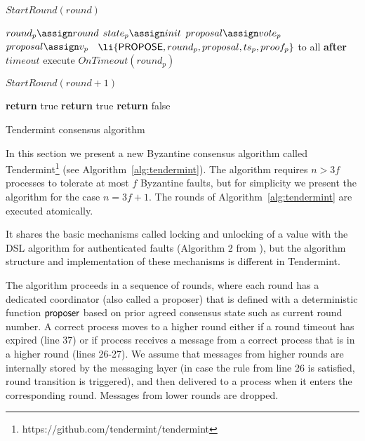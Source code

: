 \begin{algorithm}[htb!]
\begin{algorithmic}[1]
\SPACE
{} \label{line:tab:skipViews}
\STATE $StartRound(round)$
\ENDUPON


\SPACE
{} \label{line:tab:startRound}
 \STATE $round_p \assign round$
 \STATE $state_p \assign init$
     \STATE $proposal \assign vote_p$
   \ELSE 
   	 \STATE $proposal \assign v_p$
   \ENDIF	  	  
   \STATE \PBroadcast\ $\li{\Propose,round_p,proposal,ts_p, proof_p}$ to all \label{line:tab:send-propose}
 \ENDIF
  \STATE \textbf{after} $timeout$ execute $OnTimeout(round_p)$
\ENDFUNCTION

\SPACE
{} \label{line:tab:onTimeoutStart}
   \STATE $StartRound(round+1)$ \label{line:tab:onTimeout}
  \ENDIF	
\ENDFUNCTION

\SPACE
{} \label{line:tab:isValidProposal}
  \STATE \textbf{return} true
\ENDIF
{} 
  \STATE \textbf{return} true
\ENDIF
\STATE \textbf{return} false
\ENDFUNCTION

\end{algorithmic}
\caption{Tendermint consensus algorithm}
\label{alg:tendermint}
\end{algorithm}


In this section we present a new Byzantine consensus algorithm called Tendermint\footnote{https://github.com/tendermint/tendermint} 
(see Algorithm~\ref{alg:tendermint}). 
The algorithm requires $n > 3f$ processes to tolerate at most $f$ Byzantine faults, but for simplicity we present the algorithm for the case $n = 3f + 1$. The rounds of Algorithm~\ref{alg:tendermint} are executed atomically. 

It shares the basic mechanisms called locking and unlocking of a value with the DSL algorithm for authenticated faults (Algorithm 2 from \cite{DLS88:jacm}), but the algorithm structure and implementation of these mechanisms is different in Tendermint. 

The algorithm proceeds in a sequence of rounds, where each round has a dedicated coordinator (also called a proposer) that is defined with a deterministic function $\mathsf{proposer}$ based on prior agreed consensus state such as current round number. A correct process moves to a higher round either if a round timeout has expired (line 37) or if process receives a message from a correct process that is in a higher round (lines 26-27). We assume that messages from higher rounds are internally stored by the messaging layer (in case the rule from line 26 is satisfied, round transition is triggered), and then delivered to a process when it enters the corresponding round. Messages from lower rounds are dropped.  


